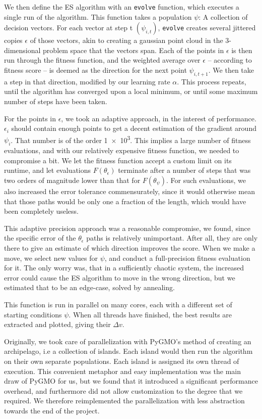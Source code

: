 We then define the ES algorithm with an \texttt{evolve} function, which executes a single run of the algorithm. This function takes a population \(\psi\): A collection of decision vectors. For each vector at step t \((\psi_{i,t})\), \texttt{evolve} creates several jittered copies \(\epsilon\) of those vectors, akin to creating a gaussian point cloud in the 3-dimensional problem space that the vectors span. Each of the points in \(\epsilon\) is then run through the fitness function, and the weighted average over \(\epsilon\) -- according to fitness score -- is deemed as the direction for the next point \(\psi_{i,t+1}\). We then take a step in that direction, modified by our learning rate \(\alpha\). This process repeats, until the algorithm has converged upon a local minimum, or until some maximum number of steps have been taken.

For the points in \(\epsilon\), we took an adaptive approach, in the interest of performance. \(\epsilon_i\) should contain enough points to get a decent estimation of the gradient around \(\psi_i\). That number is of the order \num{1e3}. This implies a large number of fitness evaluations, and with our relatively expensive fitness function, we needed to compromise a bit. We let the fitness function accept a custom limit on its runtime, and let evaluations \(F(\theta_\epsilon)\) terminate after a number of steps that was two orders of magnitude lower than that for \(F(\theta_\psi)\). For such evaluations, we also increased the error tolerance commensurately, since it would otherwise mean that those paths would be only one a fraction of  the length, which would have been completely useless.

This adaptive precision approach was a reasonable compromise, we found, since the specific error of the \(\theta_\epsilon\) paths is relatively unimportant. After all, they are only there to give an estimate of which direction improves the score. When we make a move, we select new values for \(\psi\), and conduct a full-precision fitness evaluation for it. The only worry was, that in a sufficiently chaotic system, the increased error could cause the ES algorithm to move in the wrong direction, but we estimated that to be an edge-case, solved by annealing.

This function is run in parallel on many cores, each with a different set of starting conditions \(\psi\). When all threads have finished, the best results are extracted and plotted, giving their \(\Delta v\).

Originally, we took care of parallelization with PyGMO's method of creating an archipelago, i.e a collection of islands. Each island would then run the algorithm on their own separate populations. Each island is assigned its own thread of execution. This convenient metaphor and easy implementation was the main draw of PyGMO for us, but we found that it introduced a significant performance overhead, and furthermore did not allow customization to the degree that we required. We therefore reimplemented the parallelization with less abstraction towards the end of the project.

